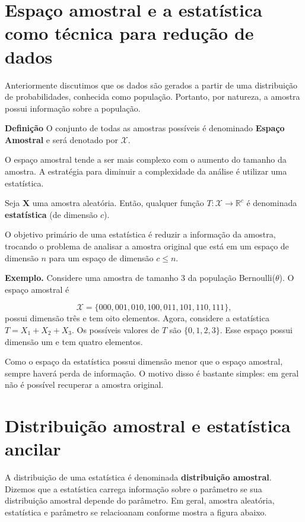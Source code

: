 \documentclass[
  letterpaper,
  DIV=11,
  numbers=noendperiod]{scrartcl}
\begin{document}
\section{Espaço amostral e a estatística como técnica para redução de
dados}\label{espauxe7o-amostral-e-a-estatuxedstica-como-tuxe9cnica-para-reduuxe7uxe3o-de-dados}

Anteriormente discutimos que os dados são gerados a partir de uma
distribuição de probabilidades, conhecida como população. Portanto, por
natureza, a amostra possui informação sobre a população.

\textbf{Definição} O conjunto de todas as amostras possíveis é
denominado \textbf{Espaço Amostral} e será denotado por \(\mathcal{X}\).

O espaço amostral tende a ser mais complexo com o aumento do tamanho da
amostra. A estratégia para diminuir a complexidade da análise é utilizar
uma estatística.

Seja \(\textbf{X}\) uma amostra aleatória. Então, qualquer função
\(T:\mathcal{X}\rightarrow \mathbb{R}^c\) é denominada
\textbf{estatística} (de dimensão \(c\)).

O objetivo primário de uma estatística é reduzir a informação da
amostra, trocando o problema de analisar a amostra original que está em
um espaço de dimensão \(n\) para um espaço de dimensão \(c\leq n\).

\textbf{Exemplo.} Considere uma amostra de tamanho 3 da população
Bernoulli(\(\theta\)). O espaço amostral é

\[\mathcal{X}=\{000,001,010,100,011,101,110,111\},\] possui dimensão
três e tem oito elementos. Agora, considere a estatística
\(T=X_1+X_2+X_3\). Os possíveis valores de \(T\) são \(\{0,1,2,3\}\).
Esse espaço possui dimensão um e tem quatro elementos.

Como o espaço da estatística possui dimensão menor que o espaço
amostral, sempre haverá perda de informação. O motivo disso é bastante
simples: em geral não é possível recuperar a amostra original.

\section{Distribuição amostral e estatística
ancilar}\label{distribuiuxe7uxe3o-amostral-e-estatuxedstica-ancilar}

A distribuição de uma estatística é denominada \textbf{distribuição
amostral}. Dizemos que a estatística carrega informação sobre o
parâmetro se sua distribuição amostral depende do parâmetro. Em geral,
amostra aleatória, estatística e parâmetro se relacioanam conforme
mostra a figura abaixo.
\end{document}
